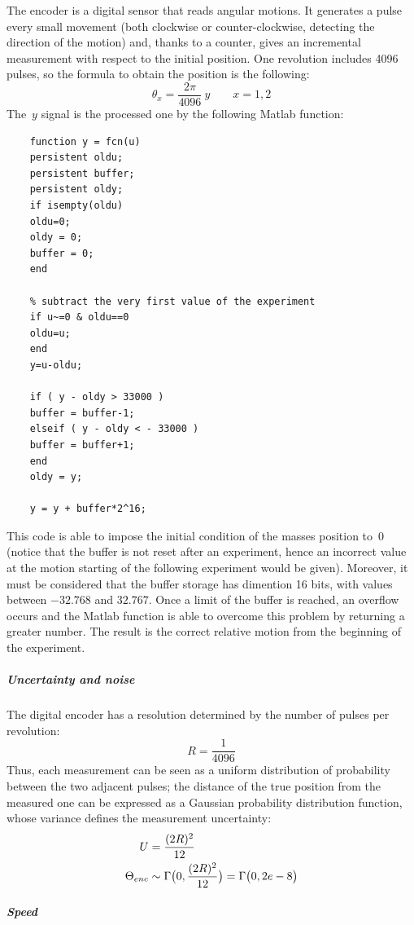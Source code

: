 The encoder is a digital sensor that reads angular motions. It generates a pulse every small movement (both clockwise or counter-clockwise, detecting the direction of the motion) and, thanks to a counter, gives an incremental measurement with respect to the initial position. One revolution includes 4096 pulses, so the formula to obtain the position is the following:
\[
	\theta_x = \frac{2\pi}{4096} \ y \qquad x={1,2}
\]
The~$y$ signal is the processed one by the following Matlab function:
\begin{verbatim}
	function y = fcn(u)
	persistent oldu;
	persistent buffer;
	persistent oldy;
	if isempty(oldu)
	oldu=0;
	oldy = 0;
	buffer = 0;
	end
	
	% subtract the very first value of the experiment
	if u~=0 & oldu==0 
	oldu=u;
	end
	y=u-oldu;
	
	if ( y - oldy > 33000 )
	buffer = buffer-1;
	elseif ( y - oldy < - 33000 )
	buffer = buffer+1;
	end
	oldy = y;
	
	y = y + buffer*2^16;
\end{verbatim}
This code is able to impose the initial condition of the masses position to~$0$ (notice that the buffer is not reset after an experiment, hence an incorrect value at the motion starting of the following experiment would be given). Moreover, it must be considered that the buffer storage has dimention 16 bits, with values between $-32.768$ and $32.767$. Once a limit of the buffer is reached, an overflow occurs and the Matlab function is able to overcome this problem by returning a greater number. The result is the correct relative motion from the beginning of the experiment.

\subparagraph{Uncertainty and noise}

The digital encoder has a resolution determined by the number of pulses per revolution:
\[
	R = \frac{1}{4096}
\]
Thus, each measurement can be seen as a uniform distribution of probability between the two adjacent pulses; the distance of the true position from the measured one can be expressed as a Gaussian probability distribution function, whose variance defines the measurement uncertainty:
\begin{align*}
	U &= \frac{(2R)^2}{12} \\
	\Theta_{enc} &\sim \Gamma \bigl{(} 0,\frac{(2R)^2}{12} \bigr{)} = \Gamma \bigl{(} 0, 2e-8 \bigr{)}
\end{align*}

\subparagraph{Speed}

